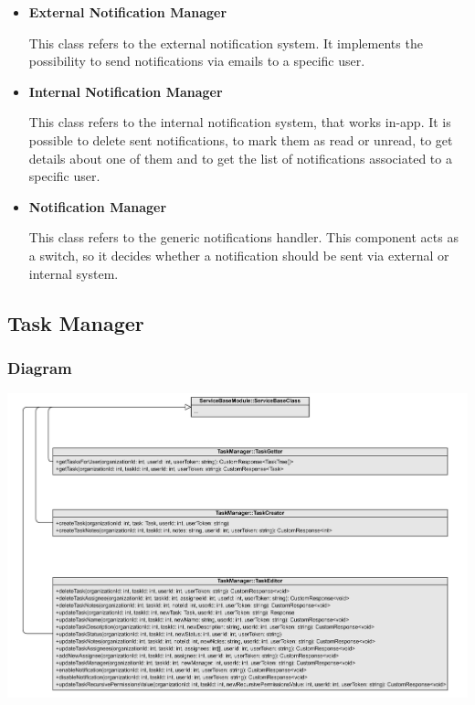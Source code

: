\documentclass{article}
\begin{document}
\begin{itemize}

\item \textbf{External Notification Manager}

This class refers to the external notification system. It implements the possibility to send notifications via emails to a specific user. 

\item \textbf{Internal Notification Manager}

This class refers to the internal notification system, that works in-app. It is possible to delete sent notifications, to mark them as read or unread, to get details about one of them and to get the list of notifications associated to a specific user.

\item \textbf{Notification Manager}

This class refers to the generic notifications handler. This component acts as a switch, so it decides whether a notification should be sent via external or internal system.
\end{itemize}

\subsection{Task Manager} %
\subsubsection{Diagram}
\includegraphics[width=\textwidth, height=\textheight, keepaspectratio]{images/class_diagram/task_manager.jpg}
\end{document}
